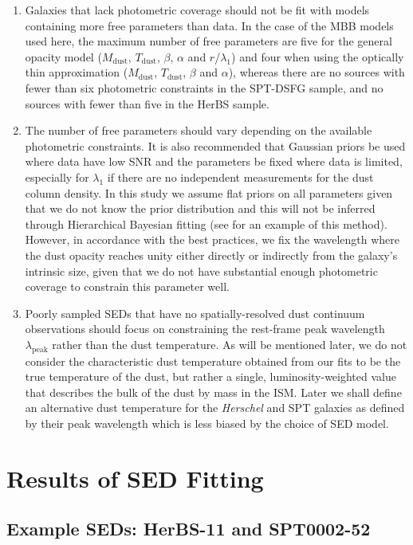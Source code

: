 \begin{enumerate}
	\item Galaxies that lack photometric coverage should not be fit with models containing more free parameters than data. In the case of the MBB models used here, the maximum number of free parameters are five for the general opacity model ($M_{\textrm{dust}}$, $T_{\textrm{dust}}$, $\beta$, $\alpha$ and $r$/$\lambda_1$) and four when using the optically thin approximation ($M_{\textrm{dust}}$, $T_{\textrm{dust}}$, $\beta$ and $\alpha$), whereas there are no sources with fewer than six photometric constraints in the SPT-DSFG sample, and no sources with fewer than five in the HerBS sample.
	\item The number of free parameters should vary depending on the available photometric constraints. It is also recommended that Gaussian priors be used where data have low SNR and the parameters be fixed where data is limited, especially for $\lambda_1$ if there are no independent measurements for the dust column density. In this study we assume flat priors on all parameters given that we do not know the prior distribution and this will not be inferred through Hierarchical Bayesian fitting (see \citealt{Lamperti_2019} for an example of this method). However, in accordance with the best practices, we fix the wavelength where the dust opacity reaches unity either directly or indirectly from the galaxy's intrinsic size, given that we do not have substantial enough photometric coverage to constrain this parameter well.
	\item Poorly sampled SEDs that have no spatially-resolved dust continuum observations should focus on constraining the rest-frame peak wavelength $\lambda_{\textrm{peak}}$ rather than the dust temperature. As will be mentioned later, we do not consider the characteristic dust temperature obtained from our fits to be the true temperature of the dust, but rather a single, luminosity-weighted value that describes the bulk of the dust by mass in the ISM. Later we shall define an alternative dust temperature for the \textit{Herschel} and SPT galaxies as defined by their peak wavelength which is less biased by the choice of SED model.
\end{enumerate}

\section{Results of SED Fitting}

\subsection{Example SEDs: HerBS-11 and SPT0002-52}

